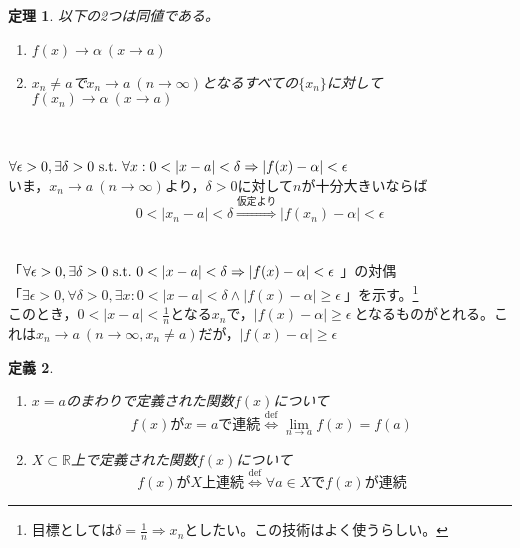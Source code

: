 \documentclass[dvipdfmx,a4j,10pt]{jsarticle}
\makeatletter
\theoremstyle{mystyle1}
\newtheorem{dfn}{定義}[part]
\newtheorem{thm}[dfn]{定理}
\theoremstyle{mystyle2}
\renewenvironment{proof}[1][\proofname]{\par
  \pushQED{\qed}%
  \normalfont
  \topsep6\p@\@plus6\p@ \trivlist
  \item[\hskip\labelsep{\bfseries\sffamily #1}]\ignorespaces
}{%
  \popQED\endtrivlist\@endpefalse
}
\renewcommand\proofname{証明}
\newcommand{\defLeftrightarrow}{\overset{\text{def}}{\iff}}
\makeatother
\begin{document}
\begin{framed}
    \begin{thm}\label{th5.2}
        以下の2つは同値である。
        \begin{enumerate}
        \item $f(x)\to\alpha\ (x\to a)$
        \item $x_n\neq a$で$x_n\to a\ (n\to\infty)$となるすべての$\{x_n\}$に対して$f(x_n)\to\alpha\ (x\to a)$
        \end{enumerate}
    \end{thm}
\end{framed}

\begin{proof}[定理\ref{th5.2}の証明]\
    \\
    \\
    $\forall\epsilon>0,\exists\delta>0\ {\rm s.t.}\ \forall x:0<|x-a|<\delta \Rightarrow |f(x)-\alpha|<\epsilon\ $\\
    いま，$x_n\to a\ (n\to\infty)$より，$\delta>0$に対して$n$が十分大きいならば
    \[0<|x_n-a|<\delta \overset{仮定より}{\Rightarrow} |f(x_n)-\alpha|<\epsilon\]
    \\
    \\
    「$\forall\epsilon>0,\exists\delta>0\ {\rm s.t.}\ 0<|x-a|<\delta \Rightarrow |f(x)-\alpha|<\epsilon\ $」の対偶\\
    「$\exists\epsilon>0,\forall\delta>0,\exists x:0<|x-a|<\delta \land |f(x)-\alpha|\geq\epsilon\ $」を示す。\footnote{目標としては$\delta=\frac{1}{n}\Rightarrow x_n$としたい。この技術はよく使うらしい。}
    \\
    このとき，$0<|x-a|<\frac{1}{n}$となる$x_n$で，$|f(x)-\alpha|\geq\epsilon\ $となるものがとれる。これは$x_n\to a\ (n\to\infty,x_n\neq a)$だが，$|f(x)-\alpha|\geq\epsilon$
\end{proof}

\newpage

\begin{framed}
    \begin{dfn}\label{def5.3}　
        \begin{enumerate}
            \item $x=a$のまわりで定義された関数$f(x)$について
            \[f(x)がx=aで連続 \defLeftrightarrow \lim_{n\to a}f(x)=f(a)\]
            \item $X\subset \mathbb{R}$上で定義された関数$f(x)$について
            \[f(x)がX上連続 \defLeftrightarrow \forall a\in Xでf(x)が連続\]
        \end{enumerate}
    \end{dfn}
\end{framed}
\end{document}
